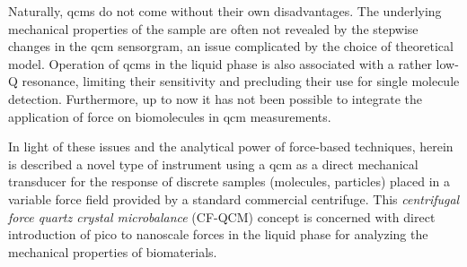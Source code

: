 Naturally, \glspl{qcm} do not come without their own disadvantages. The underlying
mechanical properties of the sample are often not revealed by the stepwise
changes in the \gls{qcm} sensorgram, an issue complicated by the choice of
theoretical model.  Operation of \glspl{qcm} in the liquid phase is also
associated with a rather low-Q resonance, limiting their sensitivity and
precluding their use for single molecule detection.  Furthermore, up to now
it has not been possible to integrate the application of force on
biomolecules in \gls{qcm} measurements.

In light of these issues and the analytical power of force-based
techniques, herein is described a novel type of instrument using a \gls{qcm} as a
direct mechanical transducer for the response of discrete samples
(molecules, particles) placed in a variable force field provided by a
standard commercial centrifuge.  This \textit{centrifugal force quartz
crystal microbalance} (CF-QCM) concept is concerned with direct
introduction of pico to nanoscale forces in the liquid phase for analyzing
the mechanical properties of biomaterials.

